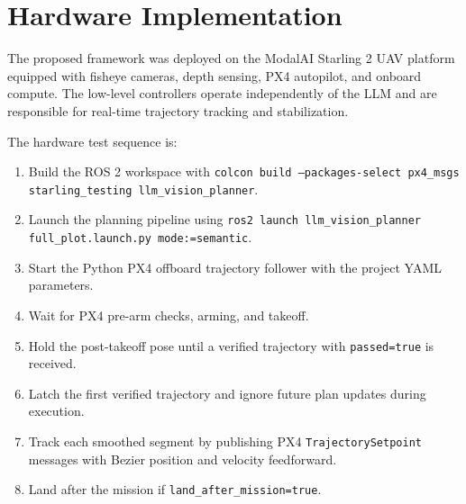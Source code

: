 \documentclass[11pt]{article}
\begin{document}
\section{Hardware Implementation}

The proposed framework was deployed on the ModalAI Starling 2 UAV platform equipped with fisheye cameras, depth sensing, PX4 autopilot, and onboard compute. The low-level controllers operate independently of the LLM and are responsible for real-time trajectory tracking and stabilization.

The hardware test sequence is:

\begin{enumerate}
  \item Build the ROS 2 workspace with \texttt{colcon build --packages-select px4\_msgs starling\_testing llm\_vision\_planner}.
  \item Launch the planning pipeline using \texttt{ros2 launch llm\_vision\_planner full\_plot.launch.py mode:=semantic}.
  \item Start the Python PX4 offboard trajectory follower with the project YAML parameters.
  \item Wait for PX4 pre-arm checks, arming, and takeoff.
  \item Hold the post-takeoff pose until a verified trajectory with \texttt{passed=true} is received.
  \item Latch the first verified trajectory and ignore future plan updates during execution.
  \item Track each smoothed segment by publishing PX4 \texttt{TrajectorySetpoint} messages with Bezier position and velocity feedforward.
  \item Land after the mission if \texttt{land\_after\_mission=true}.
\end{enumerate}
\end{document}
